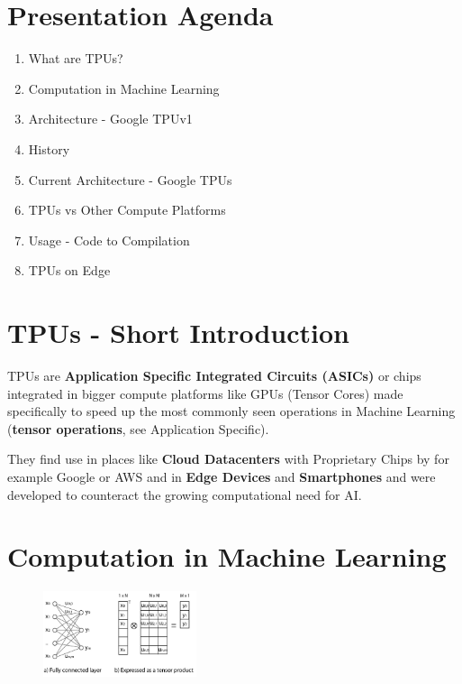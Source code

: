 \documentclass{handout}
\begin{document}
\maketitle

\section{Presentation Agenda}
\begin{enumerate}
    \item What are TPUs?
    \item Computation in Machine Learning
    \item Architecture - Google TPUv1
    \item History
    \item Current Architecture - Google TPUs
    \item TPUs vs Other Compute Platforms
    \item Usage - Code to Compilation
    \item TPUs on Edge
\end{enumerate}

\section{TPUs - Short Introduction}
TPUs are \textbf{Application Specific Integrated Circuits (ASICs)} or chips integrated in bigger compute platforms like GPUs (Tensor Cores) made specifically to speed up the most commonly seen operations in Machine Learning (\textbf{tensor operations}, see Application Specific).

They find use in places like \textbf{Cloud Datacenters} with Proprietary Chips by for example Google or AWS and in \textbf{Edge Devices} and \textbf{Smartphones} and were developed to counteract the growing computational need for AI.



\section{Computation in Machine Learning}
\begin{figure}
\includegraphics[width=0.4\textwidth]{images/Fully_connected_neural_network_and_it's_expression_as_a_tensor_product.jpg}
\end{figure}
\end{document}

